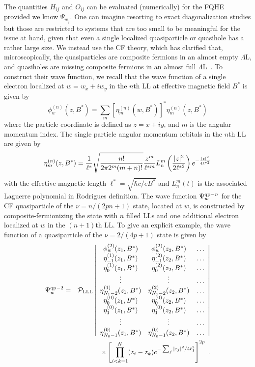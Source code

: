 \documentclass[twocolumn,floatfix,prb,aps,showpacs]{revtex4-2}
\newcommand{\be}{\begin{equation}}
\newcommand{\ee}{\end{equation}}
\begin{document}
The quantities $H_{ij}$ and $O_{ij}$ can be evaluated (numerically) for the FQHE provided we know $\Psi_{w_j}$. One can imagine resorting to exact diagonalization studies but those are restricted to systems that are too small to be meaningful for the issue at hand, given that even a single localized quasiparticle or quasihole has a rather large size. We instead use the CF theory, which has clarified that, microscopically, the quasiparticles are composite fermions in an almost empty $\Lambda$L, and quasiholes are missing composite fermions in an almost full $\Lambda$L~\cite{Jain89,Jain89b,Jain07,Jeon03b,Jeon04}. To construct their wave function, we recall that the wave function of a single electron localized at $w=w_x+iw_y$ in the $n$th LL at effective magnetic field $B^*$ is given by 
\be
\phi^{(n)}_w(z,B^*)=\sum_m [\eta^{(n)}_{m}(w,B^*)]^* \eta^{(n)}_{m}(z,B^*)
\ee
where the particle coordinate is defined as $z=x+iy$, 
and $m$ is the angular momentum index. The single particle angular momentum orbitals in the $n$th LL are given by 
\be
\eta^{(n)}_{m}(z,B^*)={1\over {\ell^{*}}}\sqrt{n!\over 2\pi 2^m(m+n)!} \frac{z^m}{\ell^{*m}}L_n^m\left({|z|^2\over {2\ell^{*2}}}\right) e^{-{|z|^2\over 4\ell^{*2}}}
\ee
with the effective magnetic length $\ell^*=\sqrt{\hbar c/eB^*}$ and $L_n^m(t)$ is the associated Laguerre polynomial in Rodrigues definition.
The wave function $\Psi_w^{{\rm qp}-n}$ for the CF quasiparticle of  
the $\nu=n/(2pn+1)$ state, located at $w$, is constructed by composite-fermionizing the state with $n$ filled LLs and one additional electron localized at $w$ in the $(n+1)$th LL.  
To give an explicit example, the wave function of a quasiparticle of the $\nu=2/(4p+1)$ state 
is given 
by
\begin{eqnarray}
\Psi^{\rm qp-2}_{w} &=& {\cal P}_{\rm LLL} 
\left|\begin{array}{ccc}
\phi^{(2)}_{w}(z_1,B^*) & \phi^{(2)}_{w}(z_2,B^*) &\ldots\\
\eta^{(1)}_{-1}(z_1,B^*) & \eta^{(2)}_{-1}(z_2,B^*) &\ldots\\
\eta^{(1)}_{0}(z_1,B^*) & \eta^{(2)}_{0}(z_2,B^*) &\ldots\\
\vdots&\vdots&\ldots \\
\eta^{(1)}_{N_1-2}(z_1,B^*) & \eta^{(2)}_{N_1-2}(z_2,B^*) &\ldots\\
\eta^{(0)}_{0}(z_1,B^*) & \eta^{(0)}_{0}(z_2,B^*) &\ldots\\
\eta^{(0)}_{1}(z_1,B^*) & \eta^{(0)}_{1}(z_2,B^*) &\ldots\\
\vdots&\vdots&\ldots \\
\eta^{(0)}_{N_0-1}(z_1,B^*) & \eta^{(0)}_{N_0-1}(z_2,B^*) &\ldots\\
\end{array}
\right| \nonumber \\
& & \;\;\;\;\times  \left[\prod_{i<k=1}^N(z_i-z_k) e^{-\sum_j|z_j|^2/4\ell_1^2}\right]^{2p}\;.
\label{CFQP}
\end{eqnarray}
\end{document}
